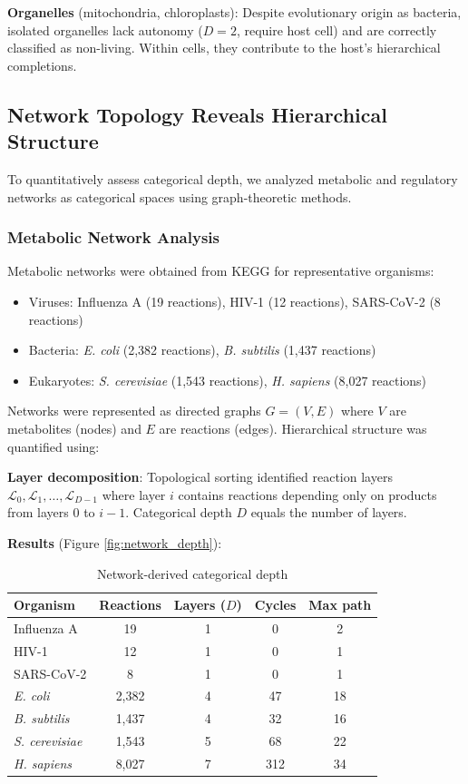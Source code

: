 \documentclass[11pt]{article}
\begin{document}
\textbf{Organelles} (mitochondria, chloroplasts): Despite evolutionary origin as bacteria, isolated organelles lack autonomy ($D = 2$, require host cell) and are correctly classified as non-living. Within cells, they contribute to the host's hierarchical completions.

\subsection{Network Topology Reveals Hierarchical Structure}

To quantitatively assess categorical depth, we analyzed metabolic and regulatory networks as categorical spaces using graph-theoretic methods.

\subsubsection{Metabolic Network Analysis}

Metabolic networks were obtained from KEGG \citep{Kanehisa2021} for representative organisms:
\begin{itemize}
\item Viruses: Influenza A (19 reactions), HIV-1 (12 reactions), SARS-CoV-2 (8 reactions)
\item Bacteria: \textit{E. coli} (2,382 reactions), \textit{B. subtilis} (1,437 reactions)
\item Eukaryotes: \textit{S. cerevisiae} (1,543 reactions), \textit{H. sapiens} (8,027 reactions)
\end{itemize}

Networks were represented as directed graphs $G = (V, E)$ where $V$ are metabolites (nodes) and $E$ are reactions (edges). Hierarchical structure was quantified using:

\textbf{Layer decomposition}: Topological sorting identified reaction layers $\mathcal{L}_0, \mathcal{L}_1, \ldots, \mathcal{L}_{D-1}$ where layer $i$ contains reactions depending only on products from layers $0$ to $i-1$. Categorical depth $D$ equals the number of layers.

\textbf{Results} (Figure \ref{fig:network_depth}):

\begin{table}[h]
\centering
\caption{Network-derived categorical depth}
\label{tab:network_depth}
\begin{tabular}{lcccc}
\hline
\textbf{Organism} & \textbf{Reactions} & \textbf{Layers ($D$)} & \textbf{Cycles} & \textbf{Max path} \\
\hline
Influenza A & 19 & 1 & 0 & 2 \\
HIV-1 & 12 & 1 & 0 & 1 \\
SARS-CoV-2 & 8 & 1 & 0 & 1 \\
\textit{E. coli} & 2,382 & 4 & 47 & 18 \\
\textit{B. subtilis} & 1,437 & 4 & 32 & 16 \\
\textit{S. cerevisiae} & 1,543 & 5 & 68 & 22 \\
\textit{H. sapiens} & 8,027 & 7 & 312 & 34 \\
\hline
\end{tabular}
\end{table}
\end{document}
